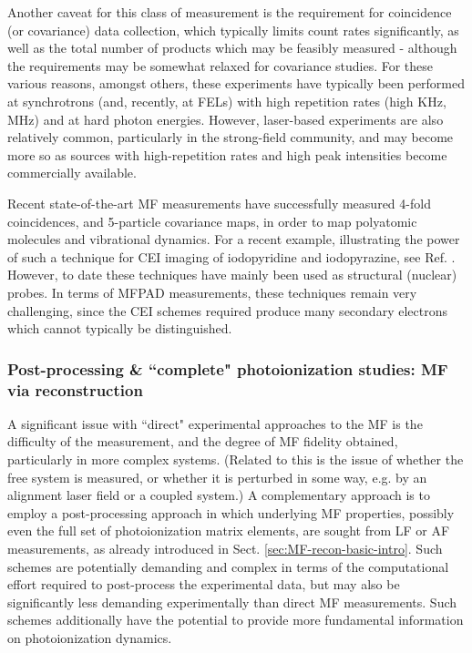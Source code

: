 \documentclass[10pt]{article}
\begin{document}
Another caveat for this class of measurement is the requirement for coincidence (or covariance) data collection, which typically limits count rates significantly, as well as the total number of products which may be feasibly measured - although the requirements may be somewhat relaxed for covariance studies. For these various reasons, amongst others, these experiments have typically been performed at synchrotrons (and, recently, at FELs) with high repetition rates (high KHz, MHz) and at hard photon energies. However, laser-based experiments are also relatively common, particularly in the strong-field community, and may become more so as sources with high-repetition rates and high peak intensities become commercially available. 

Recent state-of-the-art MF measurements have successfully measured 4-fold coincidences, and 5-particle covariance maps, in order to map polyatomic molecules and vibrational dynamics. %
For a recent example, illustrating the power of such a technique for CEI imaging of iodopyridine and iodopyrazine, see Ref.   \cite{boll2022XrayMultiphotoninducedCoulomb}. However, to date these techniques have mainly been used as structural (nuclear) probes. In terms of MFPAD measurements, these techniques remain very challenging, since the CEI schemes required produce many secondary electrons which cannot typically be distinguished. 



\subsubsection{Post-processing \& ``complete" photoionization studies: MF via reconstruction\label{sec:MF-recon-expt}}


A significant issue with ``direct" experimental approaches to the MF is the difficulty of the measurement, and the degree of MF fidelity obtained, particularly in more complex systems. (Related to this is the issue of whether the free system is measured, or whether it is perturbed in some way, e.g. by an alignment laser field or a coupled system.) A complementary approach is to employ a post-processing approach in which underlying MF properties, possibly even the full set of photoionization matrix elements, are sought from LF or AF measurements, as already introduced in Sect. \ref{sec:MF-recon-basic-intro}. Such schemes are potentially demanding and complex in terms of the computational effort required to post-process the experimental data, but may also be significantly less demanding experimentally than direct MF measurements. Such schemes additionally have the potential to provide more fundamental information on photoionization dynamics.
\end{document}
